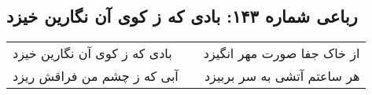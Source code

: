 \begin{center}
\section*{رباعی شماره ۱۴۳: بادی که ز کوی آن نگارین خیزد}
\label{sec:sh143}
\begin{longtable}{l p{0.5cm} r}
بادی که ز کوی آن نگارین خیزد
&&
از خاک جفا صورت مهر انگیزد
\\
آبی که ز چشم من فراقش ریزد
&&
هر ساعتم آتشی به سر بربیزد
\\
\end{longtable}
\end{center}
